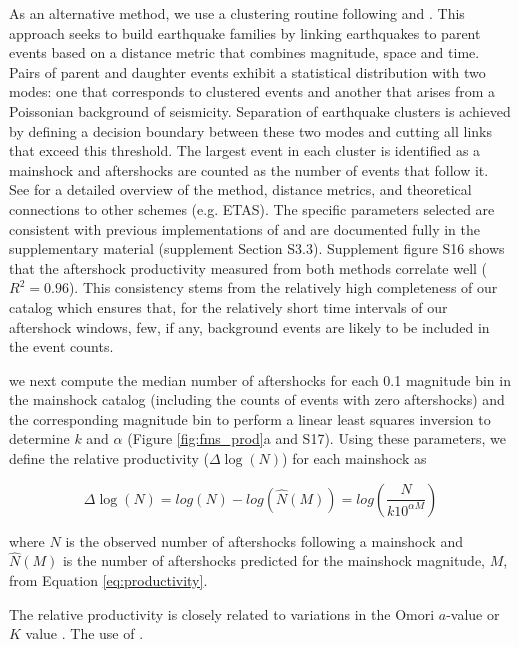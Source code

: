 \documentclass[draft, jgrga]{agujournal2018}
\begin{document}
As an alternative method, we use a clustering routine following \citet{Zaliapin2008} and \citet{Goebel2019AftershockOklahoma}. This approach seeks to build earthquake families by linking earthquakes to parent events based on a distance metric that combines magnitude, space and time. Pairs of parent and daughter events exhibit a statistical distribution with two modes: one that corresponds to clustered events and another that arises from a Poissonian background of seismicity. Separation of earthquake clusters is achieved by defining a decision boundary between these two modes and cutting all links that exceed this threshold. The largest event in each cluster is identified as a mainshock and aftershocks are counted as the number of events that follow it. See \citet{Zaliapin2008} for a detailed overview of the method, distance metrics, and theoretical connections to other schemes (e.g. ETAS). The specific parameters selected are consistent with previous implementations of \citet{Zaliapin2008} and are documented fully in the supplementary material (supplement Section S3.3). Supplement figure S16 shows that the aftershock productivity measured from both methods correlate well ($R^2=0.96$). This consistency stems from the relatively high completeness of our catalog which ensures that, for the relatively short time intervals of our aftershock windows, few, if any, background events are likely to be included in the event counts.

 we next compute the median number of aftershocks for each 0.1 magnitude bin in the mainshock catalog (including the counts of events with zero aftershocks) and the corresponding magnitude bin to perform a linear least squares inversion to determine $k$ and $\alpha$ (Figure \ref{fig:fms_prod}a and S17). Using these parameters, we define the relative productivity ($\Delta \log(N)$) for each mainshock as
%
\begin{linenomath*}
\begin{equation} 
    \Delta \log(N) = log(N) - log(\hat{N}(M)) = log\left(\dfrac{N}{k10^{\alpha M}}\right)
    \label{eq:residual_productivity}
\end{equation}
\end{linenomath*}
%
where $N$ is the observed number of aftershocks following a mainshock and $\hat{N}(M)$ is the number of aftershocks predicted for the mainshock magnitude, $M$, from Equation \ref{eq:productivity}.  

The relative productivity is closely related to variations in the Omori $a$-value or $K$ value \citep[e.g.][]{Page, Hardebeck2018UpdatedParameters, Utsu1995,Ogata1988}. The use of . 
\end{document}
